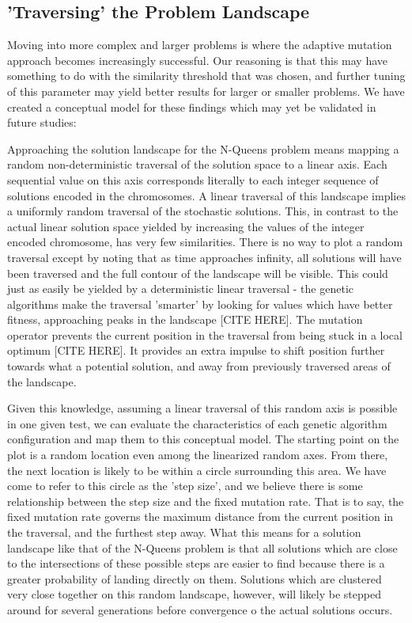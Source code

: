 \documentclass{sig-alternate}
\begin{document}
\subsection{'Traversing' the Problem Landscape}
Moving into more complex and larger problems is where the adaptive mutation approach becomes increasingly successful. Our reasoning is that this may have something to do with the similarity threshold that was chosen, and further tuning of this parameter may yield better results for larger or smaller problems. We have created a conceptual model for these findings which may yet be validated in future studies:

Approaching the solution landscape for the N-Queens problem means mapping a random non-deterministic traversal of the solution space to a linear axis. Each sequential value on this axis corresponds literally to each integer sequence of solutions encoded in the chromosomes. A linear traversal of this landscape implies a uniformly random traversal of the stochastic solutions. This, in contrast to the actual linear solution space yielded by increasing the values of the integer encoded chromosome, has very few similarities. There is no way to plot a random traversal except by noting that as time approaches infinity, all solutions will have been traversed and the full contour of the landscape will be visible. This could just as easily be yielded by a deterministic linear traversal - the genetic algorithms make the traversal 'smarter' by looking for values which have better fitness, approaching peaks in the landscape [CITE HERE]. The mutation operator prevents the current position in the traversal from being stuck in a local optimum [CITE HERE]. It provides an extra impulse to shift position further towards what a potential solution, and away from previously traversed areas of the landscape.

Given this knowledge, assuming a linear traversal of this random axis is possible in one given test, we can evaluate the characteristics of each genetic algorithm configuration and map them to this conceptual model. The starting point on the plot is a random location even among the linearized random axes. From there, the next location is likely to be within a circle surrounding this area. We have come to refer to this circle as the 'step size', and we believe there is some relationship between the step size and the fixed mutation rate. That is to say, the fixed mutation rate governs the maximum distance from the current position in the traversal, and the furthest step away. What this means for a solution landscape like that of the N-Queens problem is that all solutions which are close to the intersections of these possible steps are easier to find because there is a greater probability of landing directly on them. Solutions which are clustered very close together on this random landscape, however, will likely be stepped around for several generations before convergence o the actual solutions occurs.
\end{document}
